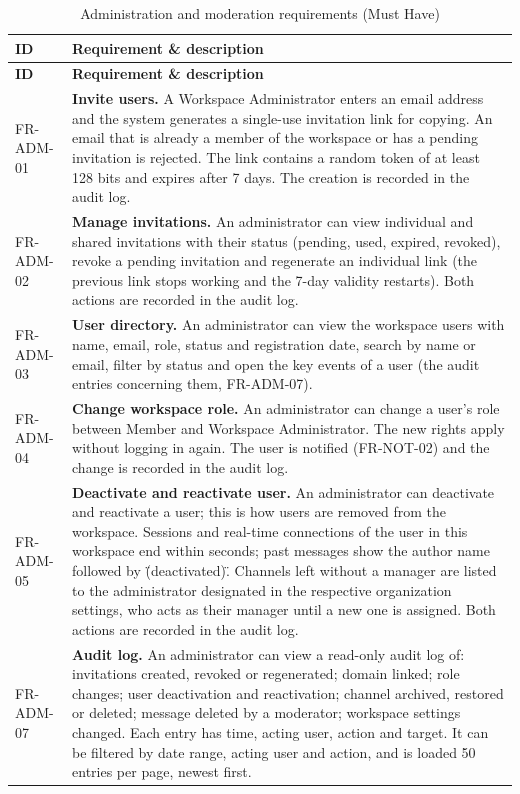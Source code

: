 \documentclass[
    english, %
]{VUMIFPSkursinis}
\newcommand{\frhead}{\textbf{ID} & \textbf{Requirement \& description} \\ \hline}
\begin{document}

\begin{longtable}{|p{}|p{}|}
\caption{Administration and moderation requirements (Must Have)}\\ \hline
\frhead
\endfirsthead
\hline \frhead
\endhead
FR-ADM-01 & \textbf{Invite users.} A Workspace Administrator enters an email address and the system generates a single-use invitation link for copying. An email that is already a member of the workspace or has a pending invitation is rejected. The link contains a random token of at least 128 bits and expires after 7 days. The creation is recorded in the audit log. \\ \hline
FR-ADM-02 & \textbf{Manage invitations.} An administrator can view individual and shared invitations with their status (pending, used, expired, revoked), revoke a pending invitation and regenerate an individual link (the previous link stops working and the 7-day validity restarts). Both actions are recorded in the audit log. \\ \hline
FR-ADM-03 & \textbf{User directory.} An administrator can view the workspace users with name, email, role, status and registration date, search by name or email, filter by status and open the key events of a user (the audit entries concerning them, FR-ADM-07). \\ \hline
FR-ADM-04 & \textbf{Change workspace role.} An administrator can change a user's role between Member and Workspace Administrator. The new rights apply without logging in again. The user is notified (FR-NOT-02) and the change is recorded in the audit log. \\ \hline
FR-ADM-05 & \textbf{Deactivate and reactivate user.} An administrator can deactivate and reactivate a user; this is how users are removed from the workspace. Sessions and real-time connections of the user in this workspace end within seconds; past messages show the author name followed by \"(deactivated)\". Channels left without a manager are listed to the administrator designated in the respective organization settings, who acts as their manager until a new one is assigned. Both actions are recorded in the audit log. \\ \hline
FR-ADM-07 & \textbf{Audit log.} An administrator can view a read-only audit log of: invitations created, revoked or regenerated; domain linked; role changes; user deactivation and reactivation; channel archived, restored or deleted; message deleted by a moderator; workspace settings changed. Each entry has time, acting user, action and target. It can be filtered by date range, acting user and action, and is loaded 50 entries per page, newest first. \\ \hline

\end{longtable}
\end{document}
